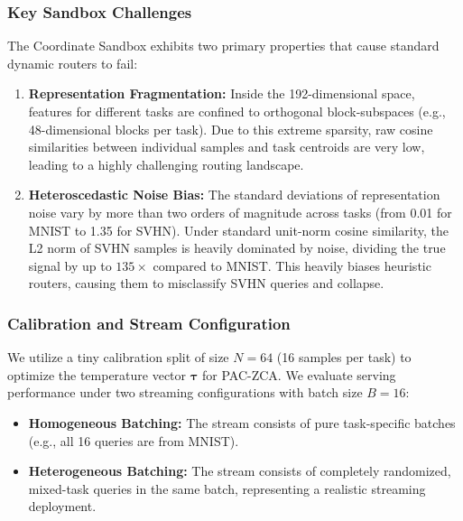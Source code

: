 \subsubsection{Key Sandbox Challenges}
The Coordinate Sandbox exhibits two primary properties that cause standard dynamic routers to fail:
\begin{enumerate}
    \item \textbf{Representation Fragmentation:} Inside the 192-dimensional space, features for different tasks are confined to orthogonal block-subspaces (e.g., 48-dimensional blocks per task). Due to this extreme sparsity, raw cosine similarities between individual samples and task centroids are very low, leading to a highly challenging routing landscape.
    \item \textbf{Heteroscedastic Noise Bias:} The standard deviations of representation noise vary by more than two orders of magnitude across tasks (from 0.01 for MNIST to 1.35 for SVHN). Under standard unit-norm cosine similarity, the L2 norm of SVHN samples is heavily dominated by noise, dividing the true signal by up to $135\times$ compared to MNIST. This heavily biases heuristic routers, causing them to misclassify SVHN queries and collapse.
\end{enumerate}

\subsubsection{Calibration and Stream Configuration}
We utilize a tiny calibration split of size $N = 64$ (16 samples per task) to optimize the temperature vector $\boldsymbol{\tau}$ for PAC-ZCA. We evaluate serving performance under two streaming configurations with batch size $B=16$:
\begin{itemize}
    \item \textbf{Homogeneous Batching:} The stream consists of pure task-specific batches (e.g., all 16 queries are from MNIST).
    \item \textbf{Heterogeneous Batching:} The stream consists of completely randomized, mixed-task queries in the same batch, representing a realistic streaming deployment.
\end{itemize}

